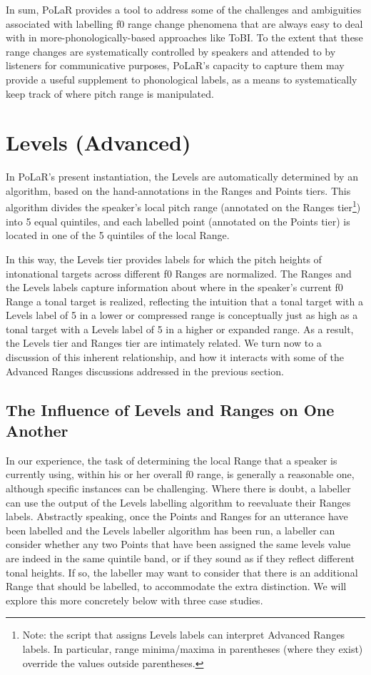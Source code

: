 \documentclass[11pt, twoside]{memoir}
\begin{document}
In sum, PoLaR provides a tool to address some of the challenges and ambiguities associated with labelling f0 range change phenomena that are always easy to deal with in more-phonologically-based approaches like ToBI.  To the extent that these range changes are systematically controlled by speakers and attended to by listeners for communicative purposes, PoLaR’s capacity to capture them may provide a useful supplement to phonological labels, as a means to systematically keep track of where pitch range is manipulated.

\section{Levels (Advanced)}\label{sec:levels-advanced}
In PoLaR’s present instantiation, the Levels are automatically determined by an algorithm, based on the hand-annotations in the Ranges and Points tiers.  This algorithm divides the speaker’s local pitch range (annotated on the Ranges tier\footnote{Note: the script that assigns Levels labels can interpret Advanced Ranges labels. In particular, range minima\slash maxima in parentheses (where they exist) override the values outside parentheses.}) into 5 equal quintiles, and each labelled point (annotated on the Points tier) is located in one of the 5 quintiles of the local Range.

In this way, the Levels tier provides labels for which the pitch heights of intonational targets across different f0 Ranges are normalized.  The Ranges and the Levels labels capture information about where in the speaker’s current f0 Range a tonal target is realized, reflecting the intuition that a tonal target with a Levels label of 5 in a lower or compressed range is conceptually just as high as a tonal target with a Levels label of 5 in a higher or expanded range. As a result, the Levels tier and Ranges tier are intimately related. We turn now to a discussion of this inherent relationship, and how it interacts with some of the Advanced Ranges discussions addressed in the previous section.

\subsection{The Influence of Levels and Ranges on One Another}\label{sec:the-influence-of-levels-and-ranges-on-one-another}

In our experience, the task of determining the local Range that a speaker is currently using, within his or her overall f0 range, is generally a reasonable one, although specific instances can be challenging. Where there is doubt, a labeller can use the output of the Levels labelling algorithm to reevaluate their Ranges labels. Abstractly speaking, once the Points and Ranges for an utterance have been labelled and the Levels labeller algorithm has been run, a labeller can consider whether any two Points that have been assigned the same levels value are indeed in the same quintile band, or if they sound as if they reflect different tonal heights.  If so, the labeller may want to consider that there is an additional Range that should be labelled, to accommodate the extra distinction. We will explore this more concretely below with three case studies.
\end{document}

